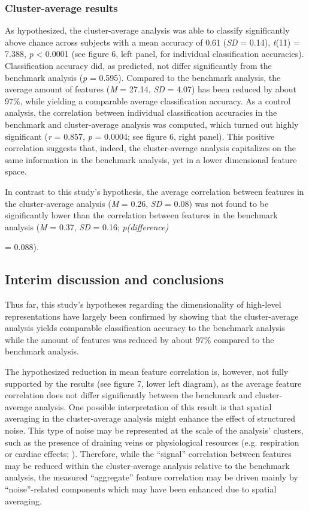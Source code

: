 \documentclass[jou,12pt,a4paper]{apa6}
\begin{document}
{\subsubsection{Cluster-average results}
\noindent As hypothesized, the cluster-average analysis was able to classify significantly above chance across subjects with a mean accuracy of 0.61 (\emph{SD} = 0.14), \emph{t}(11) = 7.388, \emph{p} < 0.0001 (see figure 6, left panel, for individual classification accuracies). Classification accuracy did, as predicted, not differ significantly from the benchmark analysis (\emph{p} = 0.595). Compared to the benchmark analysis, the average amount of features (\emph{M} = 27.14, \emph{SD} = 4.07) has been reduced by about 97\%, while yielding a comparable average classification accuracy. As a control analysis, the correlation between individual classification accuracies in the benchmark and cluster-average analysis was computed, which turned out highly significant (\emph{r} = 0.857, \emph{p} = 0.0004; see figure 6, right panel). This positive correlation suggests that, indeed, the cluster-average analysis capitalizes on the same information in the benchmark analysis, yet in a lower dimensional feature space. 

In contrast to this study's hypothesis, the average correlation between features in the cluster-average analysis (\emph{M} = 0.26, \emph{SD} = 0.08) was not found to be significantly lower than the correlation between features in the benchmark analysis (\emph{M} = 0.37, \emph{SD} = 0.16; \emph{p(difference)}} = 0.088).   

\subsection{Interim discussion and conclusions}
\noindent Thus far, this study's hypotheses regarding the dimensionality of high-level representations have largely been confirmed by showing that the cluster-average analysis yields comparable classification accuracy to the benchmark analysis while the amount of features was reduced by about 97\% compared to the benchmark analysis. 

The hypothesized reduction in mean feature correlation is, however, not fully supported by the results (see figure 7, lower left diagram), as the average feature correlation does not differ significantly between the benchmark and cluster-average analysis. One possible interpretation of this result is that spatial averaging in the cluster-average analysis might enhance the effect of structured noise. This type of noise may be represented at the scale of the analysis' clusters, such as the presence of draining veins or physiological resources (e.g. respiration or cardiac effects; ). Therefore, while the ``signal'' correlation between features may be reduced within the cluster-average analysis relative to the benchmark analysis, the measured ``aggregate'' feature correlation may be driven mainly by ``noise''-related components which may have been enhanced due to spatial averaging. 
\end{document}
